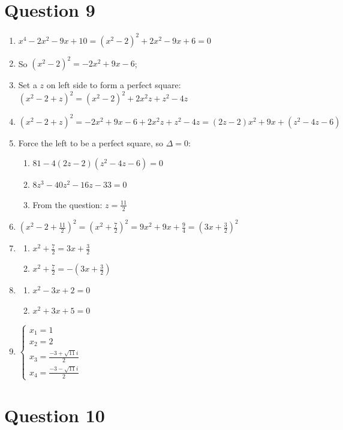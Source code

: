 \documentclass{article}
\begin{document}
\newpage

\section*{Question 9}

\begin{enumerate}
    \item $x^4-2x^2-9x+10=(x^2-2)^2+2x^2-9x+6=0$
    \item So $(x^2-2)^2=-2x^2+9x-6$;
    \item Set a $z$ on left side to form a perfect square: $(x^2-2+z)^2=(x^2-2)^2+2x^2z+z^2-4z$
    \item $(x^2-2+z)^2=-2x^2+9x-6+2x^2z+z^2-4z=(2z-2)x^2+9x+(z^2-4z-6)$
    \item Force the left to be a perfect square, so $\Delta=0$:
    \begin{enumerate}
        \item $81-4(2z-2)(z^2-4z-6)=0$
        \item $8z^3-40z^2-16z-33=0$
        \item From the question: $z= \frac{11}{2}$
    \end{enumerate}
    \item $(x^2-2+\frac{11}{2})^2=(x^2+\frac{7}{2})^2=9x^2+9x+\frac{9}{4}=(3x+\frac{3}{2})^2$
    \item \begin{enumerate}
        \item $x^2+\frac{7}{2}=3x+\frac{3}{2}$
        \item $x^2+\frac{7}{2}=-(3x+\frac{3}{2})$
    \end{enumerate}
    \item \begin{enumerate}
        \item $x^2-3x+2=0$
        \item $x^2+3x+5=0$
    \end{enumerate}
    \item $\begin{cases}
        x_1=1\\
        x_2=2\\
        x_3=\frac{-3+\sqrt{11}i}{2}\\
        x_4=\frac{-3-\sqrt{11}i}{2}
    \end{cases}$
\end{enumerate}

\newpage

\section*{Question 10}
\end{document}

